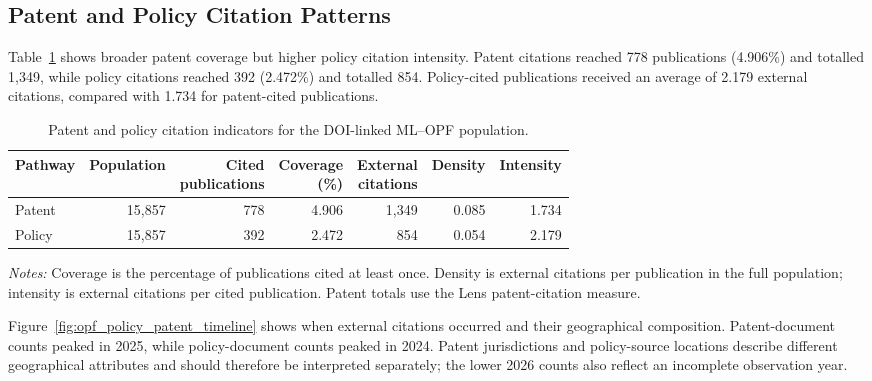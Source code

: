 \documentclass[a4paper,fleqn]{cas-sc}
\begin{document}
    \FloatBarrier
    \subsection{Patent and Policy Citation Patterns}\label{subsec:opf_external_citations}
    
    Table~\ref{tab:opf_citation_indicators} shows broader patent coverage but higher policy citation intensity. Patent citations reached 778 publications (4.906\%) and totalled 1,349, while policy citations reached 392 (2.472\%) and totalled 854. Policy-cited publications received an average of 2.179 external citations, compared with 1.734 for patent-cited publications.
    
    \begin{table}[htbp]
    \centering
    \caption{Patent and policy citation indicators for the DOI-linked ML--OPF population.}
    \label{tab:opf_citation_indicators}
    \small
    \setlength{\tabcolsep}{4pt}
    \renewcommand{\arraystretch}{1.10}
    \begin{tabular}{lrrrrrr}
    \toprule
    Pathway
    & Population
    & \shortstack{Cited\\publications}
    & \shortstack{Coverage\\(\%)}
    & \shortstack{External\\citations}
    & Density
    & Intensity \\
    \midrule
    Patent & 15,857 & 778 & 4.906 & 1,349 & 0.085 & 1.734 \\
    Policy & 15,857 & 392 & 2.472 & 854 & 0.054 & 2.179 \\
    \bottomrule
    \end{tabular}
    \par\smallskip
    \begin{minipage}{0.85\textwidth}
    \footnotesize
    \textit{Notes:} Coverage is the percentage of publications cited at least once. Density is external citations per publication in the full population; intensity is external citations per cited publication. Patent totals use the Lens patent-citation measure.
    \end{minipage}
    \end{table}
    Figure~\ref{fig:opf_policy_patent_timeline} shows when external citations occurred and their geographical composition. Patent-document counts peaked in 2025, while policy-document counts peaked in 2024. Patent jurisdictions and policy-source locations describe different geographical attributes and should therefore be interpreted separately; the lower 2026 counts also reflect an incomplete observation year.
    
\end{document}
